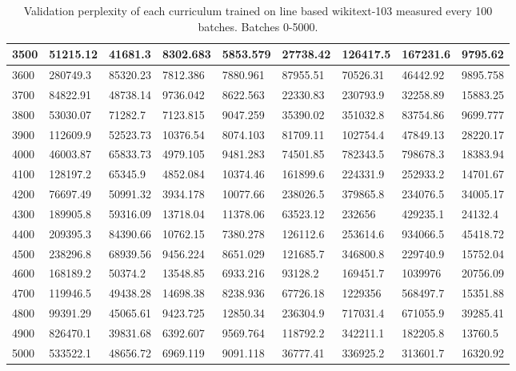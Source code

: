 \documentclass [11pt, proquest] {uwthesis}[2020/12/20]
\begin{document}
\begin{table}
\begin{tiny}
\begin{tabular}{|l|l|l|l|l|l|l|l|l|}
3500 & 51215.12 & 41681.3 & 8302.683 & 5853.579 & 27738.42 & 126417.5 & 167231.6 & 9795.62 \\ \hline
3600 & 280749.3 & 85320.23 & 7812.386 & 7880.961 & 87955.51 & 70526.31 & 46442.92 & 9895.758 \\ \hline
3700 & 84822.91 & 48738.14 & 9736.042 & 8622.563 & 22330.83 & 230793.9 & 32258.89 & 15883.25 \\ \hline
3800 & 53030.07 & 71282.7 & 7123.815 & 9047.259 & 35390.02 & 351032.8 & 83754.86 & 9699.777 \\ \hline
3900 & 112609.9 & 52523.73 & 10376.54 & 8074.103 & 81709.11 & 102754.4 & 47849.13 & 28220.17 \\ \hline
4000 & 46003.87 & 65833.73 & 4979.105 & 9481.283 & 74501.85 & 782343.5 & 798678.3 & 18383.94 \\ \hline
4100 & 128197.2 & 65345.9 & 4852.084 & 10374.46 & 161899.6 & 224331.9 & 252933.2 & 14701.67 \\ \hline
4200 & 76697.49 & 50991.32 & 3934.178 & 10077.66 & 238026.5 & 379865.8 & 234076.5 & 34005.17 \\  \hline
4300 & 189905.8 & 59316.09 & 13718.04 & 11378.06 & 63523.12 & 232656 & 429235.1 & 24132.4 \\ \hline
4400 & 209395.3 & 84390.66 & 10762.15 & 7380.278 & 126112.6 & 253614.6 & 934066.5 & 45418.72 \\ \hline
4500 & 238296.8 & 68939.56 & 9456.224 & 8651.029 & 121685.7 & 346800.8 & 229740.9 & 15752.04 \\ \hline
4600 & 168189.2 & 50374.2 & 13548.85 & 6933.216 & 93128.2 & 169451.7 & 1039976 & 20756.09 \\ \hline
4700 & 119946.5 & 49438.28 & 14698.38 & 8238.936 & 67726.18 & 1229356 & 568497.7 & 15351.88 \\ \hline
4800 & 99391.29 & 45065.61 & 9423.725 & 12850.34 & 236304.9 & 717031.4 & 671055.9 & 39285.41 \\ \hline
4900 & 826470.1 & 39831.68 & 6392.607 & 9569.764 & 118792.2 & 342211.1 & 182205.8 & 13760.5 \\ \hline
5000 & 533522.1 & 48656.72 & 6969.119 & 9091.118 & 36777.41 & 336925.2 & 313601.7 & 16320.92 \\ \hline
\end{tabular}
\end{tiny}
\caption{Validation perplexity of each curriculum trained on line based wikitext-103 measured every 100 batches. Batches 0-5000.}
\label{tab:wikitext-103-line-1}
\end{table}
\end{document}
